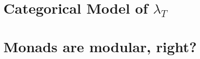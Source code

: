 \documentclass{article}
\begin{document}


\section{Categorical Model of $\lambda_T$}
\label{sec:categorical_model_of_lambdaT}



\section{Monads are modular, right?}
\label{sec:monads_are_modular,_right?}



 
\end{document}
